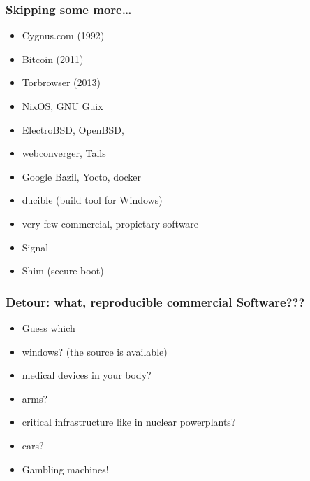 \documentclass[14pt]{beamer}
\begin{document}
\begin{frame}
 \frametitle{Skipping some more…}
 \begin{itemize}
\item Cygnus.com (1992)
\item Bitcoin (2011)
\item Torbrowser (2013)
\item<2-3> NixOS, GNU Guix
\item<2-3> ElectroBSD, OpenBSD, 
\item<2-3> webconverger, Tails
\item<2-3> Google Bazil, Yocto, docker
\item<3> ducible (build tool for Windows)
\item<3> very few commercial, propietary software
\item<3> Signal
\item<3> Shim (secure-boot)
 \end{itemize}
\end{frame}


\begin{frame}
 \frametitle{Detour: what, reproducible commercial Software???}
 \begin{itemize}
\item Guess which
\item <2-3>   windows? (the source is available)
\item <2-3>   medical devices in your body?
\item <2-3>   arms?
\item <2-3>   critical infrastructure like in nuclear powerplants?
\item <2-3>   cars?
\item <3> Gambling machines!
 \end{itemize}
\end{frame}
\end{document}
